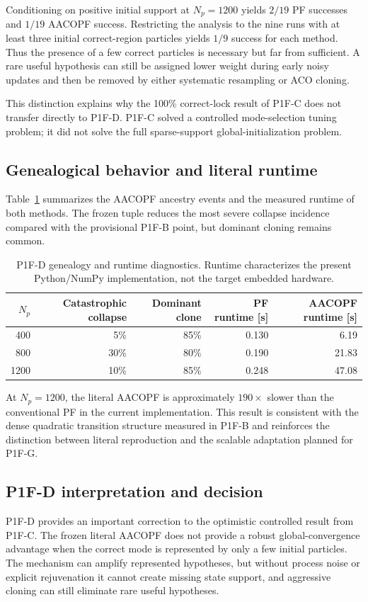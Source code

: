 Conditioning on positive initial support at $N_p=1200$ yields $2/19$ PF successes and $1/19$ AACOPF success. Restricting the analysis to the nine runs with at least three initial correct-region particles yields $1/9$ success for each method. Thus the presence of a few correct particles is necessary but far from sufficient. A rare useful hypothesis can still be assigned lower weight during early noisy updates and then be removed by either systematic resampling or ACO cloning.

This distinction explains why the 100\% correct-lock result of P1F-C does not transfer directly to P1F-D. P1F-C solved a controlled mode-selection tuning problem; it did not solve the full sparse-support global-initialization problem.

\subsection{Genealogical behavior and literal runtime}
Table~\ref{tab:p1fd_runtime} summarizes the AACOPF ancestry events and the measured runtime of both methods. The frozen tuple reduces the most severe collapse incidence compared with the provisional P1F-B point, but dominant cloning remains common.

\begin{table}[htbp]
    \centering
    \caption{P1F-D genealogy and runtime diagnostics. Runtime characterizes the present Python/NumPy implementation, not the target embedded hardware.}
    \label{tab:p1fd_runtime}
    \begin{tabular}{rrrrr}
        \toprule
        $N_p$ & Catastrophic collapse & Dominant clone & PF runtime [s] & AACOPF runtime [s]\\
        \midrule
        400  & 5\%  & 85\% & 0.130 & 6.19\\
        800  & 30\% & 80\% & 0.190 & 21.83\\
        1200 & 10\% & 85\% & 0.248 & 47.08\\
        \bottomrule
    \end{tabular}
\end{table}

At $N_p=1200$, the literal AACOPF is approximately $190\times$ slower than the conventional PF in the current implementation. This result is consistent with the dense quadratic transition structure measured in P1F-B and reinforces the distinction between literal reproduction and the scalable adaptation planned for P1F-G.

\subsection{P1F-D interpretation and decision}
P1F-D provides an important correction to the optimistic controlled result from P1F-C. The frozen literal AACOPF does not provide a robust global-convergence advantage when the correct mode is represented by only a few initial particles. The mechanism can amplify represented hypotheses, but without process noise or explicit rejuvenation it cannot create missing state support, and aggressive cloning can still eliminate rare useful hypotheses.

